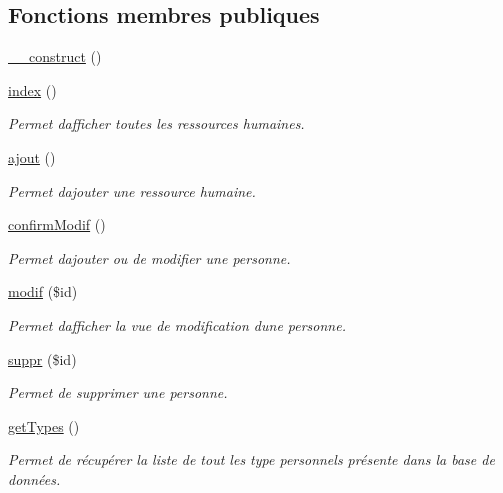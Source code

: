 \subsection*{Fonctions membres publiques}
\begin{DoxyCompactItemize}
\item 
\hyperlink{class_personnels_a4b54507970c94e65af956bc561946f6c}{\+\_\+\+\_\+construct} ()
\item 
\hyperlink{class_personnels_a0b50be758dae7b0ea804936577b06357}{index} ()
\begin{DoxyCompactList}\small\item\em Permet d\textquotesingle{}afficher toutes les ressources humaines. \end{DoxyCompactList}\item 
\hyperlink{class_personnels_ab9868ae1b1966f8e9b00ee9431f1a88d}{ajout} ()
\begin{DoxyCompactList}\small\item\em Permet d\textquotesingle{}ajouter une ressource humaine. \end{DoxyCompactList}\item 
\hyperlink{class_personnels_a09d71689c3e7ae5472301c60674a2cf8}{confirm\+Modif} ()
\begin{DoxyCompactList}\small\item\em Permet d\textquotesingle{}ajouter ou de modifier une personne. \end{DoxyCompactList}\item 
\hyperlink{class_personnels_a2b1fee34642a3fc87dfce046a00eb4a2}{modif} (\$id)
\begin{DoxyCompactList}\small\item\em Permet d\textquotesingle{}afficher la vue de modification d\textquotesingle{}une personne. \end{DoxyCompactList}\item 
\hyperlink{class_personnels_a86deb89c14bbe050b7adb09ac6f0dad2}{suppr} (\$id)
\begin{DoxyCompactList}\small\item\em Permet de supprimer une personne. \end{DoxyCompactList}\item 
\hyperlink{class_personnels_ad260f97073aa7af9cc1e966ed9e0ca13}{get\+Types} ()
\begin{DoxyCompactList}\small\item\em Permet de récupérer la liste de tout les type personnels présente dans la base de données. \end{DoxyCompactList}\end{DoxyCompactItemize}


